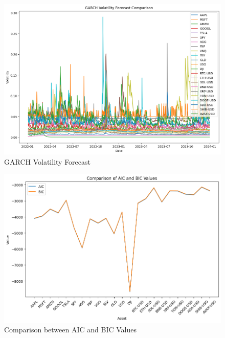\begin{figure}
    \centering
    \includegraphics[width=\textwidth]{code/volatility-analysis/garch-with-mulit-assets/garch_forecast.png}
    \caption{GARCH Volatility Forecast}
    \label{fig:exp_return}
\end{figure}

\begin{figure}
    \centering
    \includegraphics[width=\textwidth]{code/volatility-analysis/garch-with-mulit-assets/aic_bic.png}
    \caption{Comparison between AIC and BIC Values}
    \label{fig:exp_return}
\end{figure}

